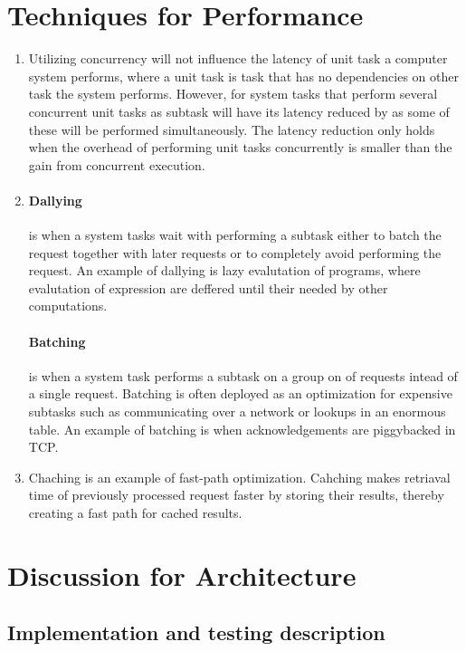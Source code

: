 \documentclass[a4paper]{article}
\begin{document}
\section{Techniques for Performance}
\begin{enumerate}

\item Utilizing concurrency will not influence the latency of unit task a computer system performs, where a unit task is task that has no dependencies on other task the system performs. However, for system tasks that perform several concurrent unit tasks as subtask will have its latency reduced by as some of these will be performed simultaneously. The latency reduction only holds when the overhead of performing unit tasks concurrently is smaller than the gain from concurrent execution.
\item \paragraph{Dallying} is when a system tasks wait with performing a subtask either to batch the request together with later requests or to completely avoid performing the request. An example of dallying is lazy evalutation of programs, where evalutation of expression are deffered until their needed by other computations.
\paragraph{Batching} is when a system task performs a subtask on a group on of requests intead of a single request. Batching is often deployed as an optimization for expensive subtasks such as communicating over a network or lookups in an enormous table. An example of batching is when acknowledgements are piggybacked in TCP.
\item Chaching is an example of fast-path optimization. Cahching makes retriaval time of previously processed request faster by storing their results, thereby creating a fast path for cached results.
\end{enumerate}
\section{Discussion for Architecture}
\subsection{Implementation and testing description}
\end{document}
